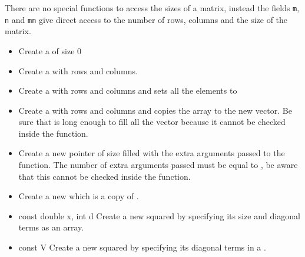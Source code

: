 There are no special functions to access the sizes of a matrix, instead the fields
\verb!m!, \verb!n! and \verb!mn! give direct access to the number of rows, columns
and the size of the matrix.

\begin{itemize}
  \item {}
  \sshortdescribe Create a  of size 0

\item {}
  \sshortdescribe Create a   with  rows and  columns.

\item {}
  \sshortdescribe Create a  with  rows and 
  columns and sets all the elements to 

\item {}
  \sshortdescribe Create a  with  rows and 
  columns and copies the array  to the new vector. Be sure that 
  is long enough to fill all the vector because it cannot be checked inside the function.

\item {}
  \sshortdescribe Create a new  pointer of size  filled with the extra arguments passed to the function. The
  number of extra arguments passed must be equal to , be
  aware that this cannot be checked inside the function.

\item {}
  \sshortdescribe Create a new  which is a copy of .
  
\item {}
  {const double \ptr x, int d}
  \sshortdescribe Create a new squared  by specifying its size and
  diagonal terms as an array.

\item {}
  {const  \ptr V}
  \sshortdescribe Create a new squared  by specifying its diagonal
  terms in a .


\end{itemize}
